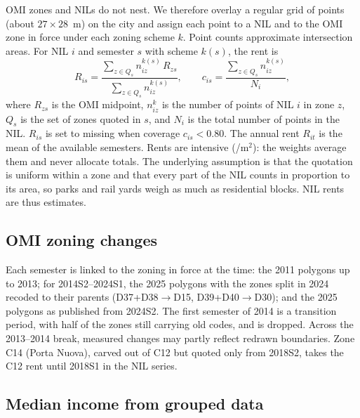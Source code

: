 OMI zones and NILs do not nest. We therefore overlay a regular grid of points
(about $27\times 28$~m) on the city and assign each point to a NIL and to the
OMI zone in force under each zoning scheme $k$. Point counts approximate
intersection areas. For NIL $i$ and semester $s$ with scheme $k(s)$, the rent
is
\begin{equation}\label{eq:rent}
R_{is}=\frac{\sum_{z\in Q_s} n^{k(s)}_{iz}\,R_{zs}}{\sum_{z\in Q_s} n^{k(s)}_{iz}},
\qquad
c_{is}=\frac{\sum_{z\in Q_s} n^{k(s)}_{iz}}{N_i},
\end{equation}
where $R_{zs}$ is the OMI midpoint, $n^{k}_{iz}$ is the number of points of
NIL $i$ in zone $z$, $Q_s$ is the set of zones quoted in $s$, and $N_i$ is the
total number of points in the NIL. $R_{is}$ is set to missing when coverage
$c_{is}<0.80$. The annual rent $R_{it}$ is the mean of the available
semesters. Rents are intensive (\eur/m$^2$): the weights average them and
never allocate totals. The underlying assumption is that the quotation is
uniform within a zone and that every part of the NIL counts in proportion to
its area, so parks and rail yards weigh as much as residential blocks. NIL
rents are thus estimates.

\subsection{OMI zoning changes}\label{sec:zoning}

Each semester is linked to the zoning in force at the time: the 2011 polygons
up to 2013; for 2014S2--2024S1, the 2025 polygons with the zones split in 2024
recoded to their parents (D37+D38$\to$D15, D39+D40$\to$D30); and the 2025
polygons as published from 2024S2. The first semester of 2014 is a transition
period, with half of the zones still carrying old codes, and is dropped.
Across the 2013--2014 break, measured changes may partly reflect redrawn
boundaries. Zone C14 (Porta Nuova), carved out of C12 but quoted only from
2018S2, takes the C12 rent until 2018S1 in the NIL series.

\subsection{Median income from grouped data}\label{sec:median}


